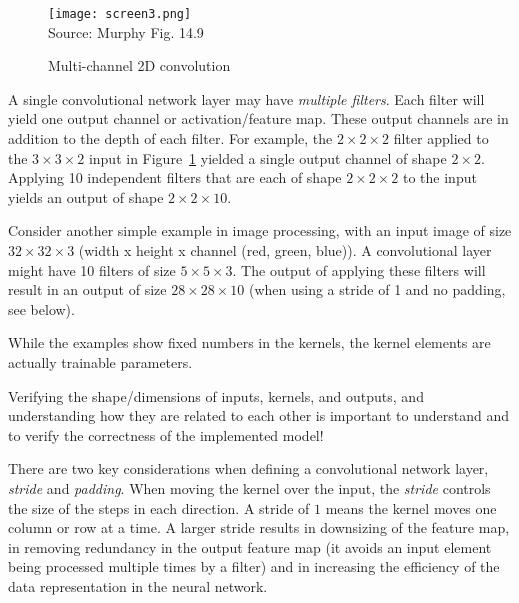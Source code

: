 \begin{figure}[b]
\centering
\texttt{[image: screen3.png]} \\

\scriptsize Source: Murphy Fig. 14.9
\caption{Multi-channel 2D convolution}
\label{fig:screen3}
\end{figure}

A single convolutional network layer may have \emph{multiple filters}. Each filter will yield one output channel or activation/feature map. These output channels are in addition to the depth of each filter. For example, the $2 \times 2 \times 2$ filter applied to the $3 \times 3 \times 2$ input in Figure~\ref{fig:screen3} yielded a single output channel of shape $2 \times 2$. Applying 10 independent filters that are each of shape $2 \times 2 \times 2$ to the input yields an output of shape $2 \times 2 \times 10$.

Consider another simple example in image processing, with an input image of size $32 \times 32 \times 3$ (width x height x channel (red, green, blue)). A convolutional layer might have 10 filters of size $5 \times 5 \times 3$. The output of applying these filters will result in an output of size $28 \times 28 \times 10$ (when using a stride of 1 and no padding, see below).

\begin{tcolorbox}[colback=alert]
While the examples show fixed numbers in the kernels, the kernel elements are actually trainable parameters.
\end{tcolorbox}

\begin{tcolorbox}[colback=alert]
Verifying the shape/dimensions of inputs, kernels, and outputs, and understanding how they are related to each other is important to understand and to verify the correctness of the implemented model!
\end{tcolorbox}

There are two key considerations when defining a convolutional network layer, \emph{stride} and \emph{padding}. When moving the kernel over the input, the \emph{stride} controls the size of the steps in each direction. A stride of $1$ means the kernel moves one column or row at a time. A larger stride results in downsizing of the feature map, in removing redundancy in the output feature map (it avoids an input element being processed multiple times by a filter) and in increasing the efficiency of the data representation in the neural network.

